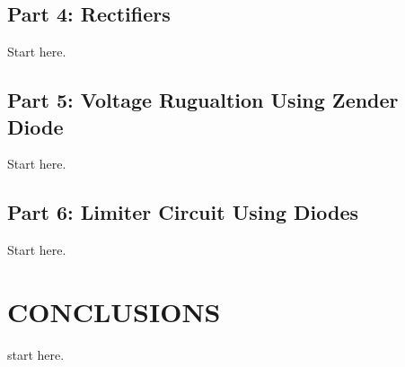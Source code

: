 \documentclass[letterpaper, 10 pt, conference]{ieeeconf}  %
\begin{document}
    \subsection{Part 4: Rectifiers}
    Start here.
    \subsection{Part 5: Voltage Rugualtion Using Zender Diode}
    Start here.
    \subsection{Part 6: Limiter Circuit Using Diodes}
    Start here.

    \section{CONCLUSIONS}
    start here.









%
%
%
%
%
%
%
\end{document}
